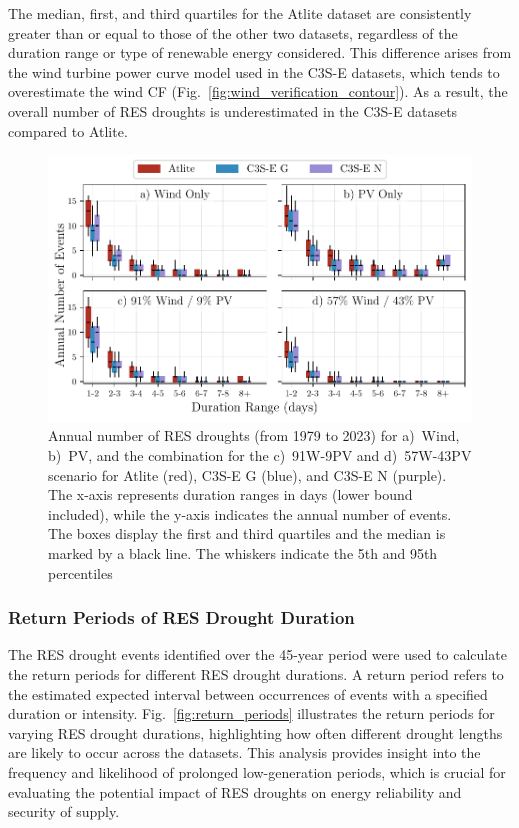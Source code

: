 \documentclass[a4paper, 11p1t]{article}
\begin{document}
The median, first, and third quartiles for the Atlite dataset are consistently greater than or equal to those of the other two datasets, regardless of the duration range or type of renewable energy considered. This difference arises from the wind turbine power curve model used in the C3S-E datasets, which tends to overestimate the wind CF (Fig.~\ref{fig:wind_verification_contour}). As a result, the overall number of RES droughts is underestimated in the C3S-E datasets compared to Atlite. 

\begin{figure}[!ht]
	\centering
	\includegraphics{droughts_number_events.pdf}
	\caption{Annual number of RES droughts (from 1979 to 2023) for a)~Wind, b)~PV, and the combination for the c)~91W-9PV and d)~57W-43PV scenario for Atlite (red), C3S-E G (blue), and C3S-E N (purple). The x-axis represents duration ranges in days (lower bound included), while the y-axis indicates the annual number of events. The boxes display the first and third quartiles and the median is marked by a black line. The whiskers indicate the 5th and 95th percentiles}
	\label{fig:boxplot_number_events}	
\end{figure}

\newpage
\subsubsection{Return Periods of RES Drought Duration}

The RES drought events identified over the 45-year period were used to calculate the return periods for different RES drought durations. A return period refers to the estimated expected interval between occurrences of events with a specified duration or intensity. Fig.~\ref{fig:return_periods} illustrates the return periods for varying RES drought durations, highlighting how often different drought lengths are likely to occur across the datasets. This analysis provides insight into the frequency and likelihood of prolonged low-generation periods, which is crucial for evaluating the potential impact of RES droughts on energy reliability and security of supply.
\end{document}
